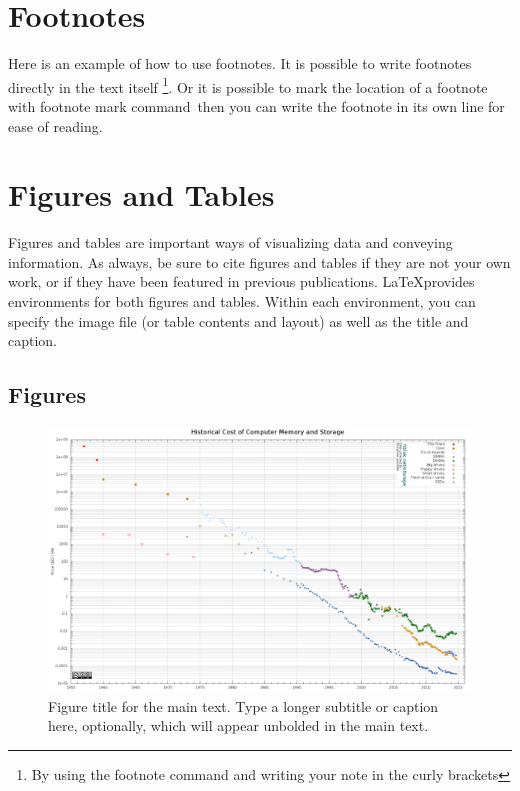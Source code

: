\section{Footnotes}

Here is an example of how to use footnotes. It is possible to write footnotes directly in the text itself \footnote{By using the footnote command and writing your note in the curly brackets}. Or it is possible to mark the location of a footnote with footnote mark command\footnotemark \, then you can write the footnote in its own line for ease of reading. 


\section{Figures and Tables}

Figures and tables are important ways of visualizing data and conveying information. As always, be sure to cite figures and tables if they are not your own work, or if they have been featured in previous publications. \LaTeX provides environments for both figures and tables. Within each environment, you can specify the image file (or table contents and layout) as well as the title and caption.

\subsection{Figures}

\begin{figure}
	\includegraphics[width=\textwidth]{figures/exampleFigure.png} %
	\caption[Figure title for the Table of Contents]{ 
    Figure title for the main text. %
    \textmd{Type a longer subtitle or caption here, optionally, which will appear unbolded in the main text.}
    }
	\label{figurelabel} %
\end{figure}

